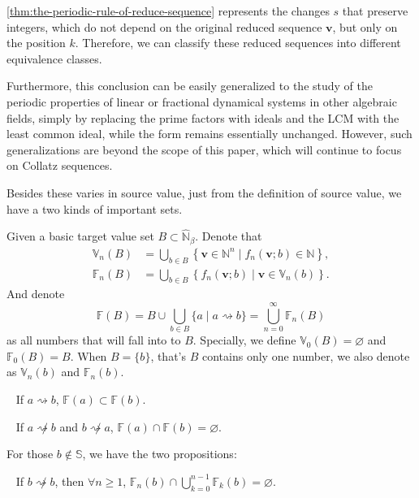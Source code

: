\cref{thm:the-periodic-rule-of-reduce-sequence} represents the changes $s$ that preserve integers, which do not depend on the original reduced sequence $\bm{v}$, but only on the position $k$.
Therefore, we can classify these reduced sequences into different equivalence classes.

Furthermore, this conclusion can be easily generalized to the study of the periodic properties of linear or fractional dynamical systems in other algebraic fields, simply by replacing the prime factors with ideals and the LCM with the least common ideal, while the form remains essentially unchanged.
However, such generalizations are beyond the scope of this paper, which will continue to focus on Collatz sequences.


Besides these varies in source value, just from the definition of source value, we have a two kinds of important sets.
\begin{definition}
Given a basic target value set $B \subset \widehat{\mathbb{N}}_{{\beta}}$. Denote that
\begin{align*}
    \mathbb{V}_n(B) &= \bigcup_{b\in B}\left\{ \bm{v} \in \mathbb{N}^{n} \mid f_{n}(\bm{v};b) \in \mathbb{N} \right\},\\
    \mathbb{F}_n(B) &= \bigcup_{b\in B}\left\{ f_n(\bm{v};b) \mid \bm{v} \in \mathbb{V}_n(b) \right\}.
\end{align*}
And denote
\[\mathbb{F}(B) = B\cup\bigcup_{b\in B}\{ a \mid a\rightsquigarrow b \} = \bigcup_{n = 0}^{\infty}\mathbb{F}_{n}(B)\]
as all numbers that will fall into to $B$.
Specially, we define $\mathbb{V}_0(B) = \varnothing$ and $\mathbb{F}_0(B) = B$. When $B = \{b\}$, that's $B$ contains only one number, we also denote as $\mathbb{V}_n(b)$ and $\mathbb{F}_n(b)$.
\end{definition}
\begin{proposition}~\label{prop:source-set-include}
    If $a\rightsquigarrow b$, $\mathbb{F}(a) \subset \mathbb{F}(b)$.
\end{proposition}
\begin{proposition}~\label{prop:source-set-disjoint}
    If $a \not\rightsquigarrow b$ and $b \not\rightsquigarrow a$, $\mathbb{F}(a) \cap \mathbb{F}(b) = \varnothing$.
\end{proposition}
For those $b\not\in \mathbb{S}$, we have the two propositions:
\begin{proposition}~\label{prop:non-cycle-layer-independent}
    If $b \not\rightsquigarrow b$, then $\forall n \ge 1$, $\mathbb{F}_{n}(b) \cap \bigcup_{k = 0}^{n-1}\mathbb{F}_{k}(b) = \varnothing$.
\end{proposition}

